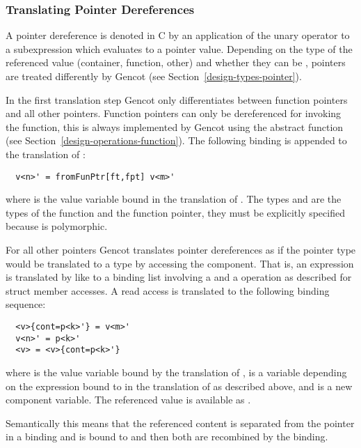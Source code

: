 \subsubsection{Translating Pointer Dereferences}

A pointer dereference is denoted in C by an application of the unary operator \code{*} to a subexpression  which evaluates to
a pointer value. Depending on the type of the referenced value (container, function, other) and whether they can be ,
pointers are treated differently by Gencot (see Section~\ref{design-types-pointer}).

In the first translation step Gencot only differentiates between function pointers and all other pointers. Function pointers
can only be dereferenced for invoking the function, this is always implemented by Gencot using the abstract function
 (see Section~\ref{design-operations-function}). The following binding is appended to the translation of :
\begin{verbatim}
  v<n>' = fromFunPtr[ft,fpt] v<m>'
\end{verbatim}
where  is the value variable bound in the translation of . The types  and  are
the types of the function and the function pointer, they must be explicitly specified because  is polymorphic.

For all other pointers Gencot translates pointer dereferences as if the
pointer type would be translated to a type  by accessing the  component. That is, an expression
 is translated by  like  to a binding list involving a  and a 
operation as described for struct member accesses. A read access is translated to the following binding sequence:
\begin{verbatim}
  <v>{cont=p<k>'} = v<m>'
  v<n>' = p<k>'
  <v> = <v>{cont=p<k>'}
\end{verbatim}
where  is the value variable bound by the translation of ,  is a variable
depending on the expression bound to  in the translation of  as described above, and 
is a new component variable. The referenced value is available as .

Semantically this means that the referenced content is separated from the pointer in a  binding and is bound
to  and then both are recombined by the  binding.

